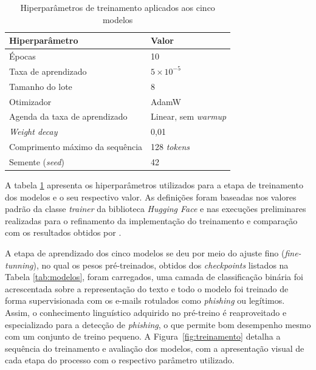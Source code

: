 \documentclass[12pt]{article}
\begin{document}
            
                \begin{table}[ht]
                \centering
                \caption{Hiperparâmetros de treinamento aplicados aos cinco modelos}
                \label{tab:hiperparametros}
                \begin{tabular}{ll}
                \hline
                \textbf{Hiperparâmetro} & \textbf{Valor} \\
                \hline
                    Épocas                          & 10 \\
                    Taxa de aprendizado             & $5 \times 10^{-5}$ \\
                    Tamanho do lote                 & 8 \\
                    Otimizador                      & AdamW \\
                    Agenda da taxa de aprendizado   & Linear, sem \textit{warmup} \\
                    \textit{Weight decay}           & 0,01 \\
                    Comprimento máximo da sequência & 128 \textit{tokens} \\
                    Semente (\textit{seed})         & 42 \\
                \hline
            \end{tabular}
            \end{table}

        A tabela \ref{tab:hiperparametros} apresenta os hiperparâmetros utilizados para a etapa de treinamento dos modelos e o seu respectivo valor.  As definições foram baseadas nos valores padrão da classe \textit{trainer} da biblioteca \textit{Hugging Face} e nas execuções preliminares realizadas para o refinamento da implementação do treinamento e comparação com os resultados obtidos por \cite{bispo2025philder}.

        A etapa de aprendizado dos cinco modelos se deu por meio do ajuste fino (\textit{fine-tunning}), no qual os  pesos pré-treinados, obtidos dos \textit{checkpoints} listados na Tabela \ref{tab:modelos}, foram carregados, uma camada de classificação binária foi acrescentada sobre a representação do texto e todo o modelo foi treinado de forma supervisionada com os e-mails rotulados como \textit{phishing} ou legítimos. Assim, o conhecimento linguístico adquirido no pré-treino é reaproveitado e especializado para a detecção de \textit{phishing}, o que permite bom desempenho mesmo com um conjunto de treino pequeno. A Figura~\ref{fig:treinamento} detalha a sequência do treinamento e avaliação dos modelos, com a apresentação visual de cada etapa do processo com o respectivo parâmetro utilizado.
        
\end{document}
